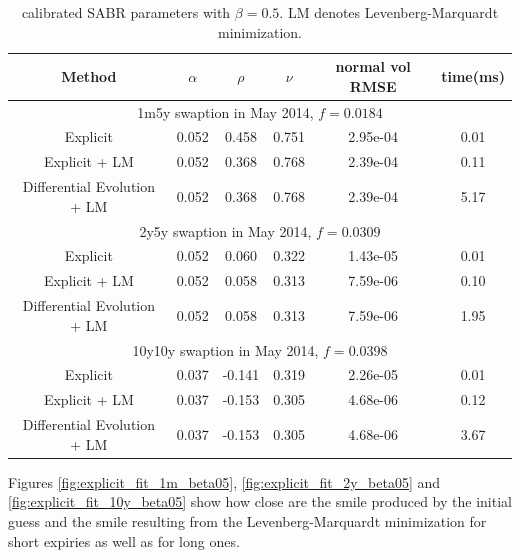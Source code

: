 \documentclass[]{rAMF2e}
\begin{document}
\begin{table}[h]
\begin{center}
\caption{\label{tbl:normal_sabr_fit}calibrated SABR parameters with $\beta=0.5$. LM denotes Levenberg-Marquardt minimization.}
\begin{tabular}{c c c c c c}
\hline
Method & $\alpha$ & $\rho$ &$\nu$ & normal vol RMSE & time(ms) \\
\hline
\multicolumn{6}{c}{1m5y swaption in May 2014, $f=0.0184$}\\
\hline
Explicit & 0.052 & 0.458 & 0.751 & 2.95e-04 & 0.01 \\
Explicit + LM  & 0.052 & 0.368 & 0.768 & 2.39e-04 & 0.11\\
Differential Evolution + LM  & 0.052 & 0.368 & 0.768 & 2.39e-04 & 5.17 \\
\hline
\multicolumn{6}{c}{2y5y swaption in May 2014, $f=0.0309$}\\
\hline
Explicit & 0.052 & 0.060 & 0.322 & 1.43e-05 & 0.01 \\
Explicit + LM & 0.052 & 0.058 & 0.313 & 7.59e-06 & 0.10\\
Differential Evolution + LM & 0.052 & 0.058 & 0.313 & 7.59e-06 & 1.95\\
\hline
\multicolumn{6}{c}{10y10y swaption in May 2014, $f=0.0398$}\\
\hline
Explicit & 0.037 & -0.141 & 0.319 & 2.26e-05 & 0.01 \\
Explicit + LM  & 0.037 & -0.153 & 0.305 & 4.68e-06 & 0.12\\
Differential Evolution + LM  & 0.037 & -0.153 & 0.305 & 4.68e-06 & 3.67\\
\hline
\end{tabular}
\end{center}
\end{table}
Figures \ref{fig:explicit_fit_1m_beta05}, \ref{fig:explicit_fit_2y_beta05} and \ref{fig:explicit_fit_10y_beta05} show how close are the smile produced by the initial guess and the smile resulting from the Levenberg-Marquardt minimization for short expiries as well as for long ones.
\end{document}
